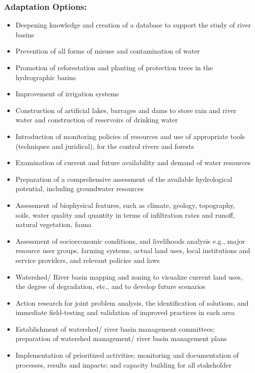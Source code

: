 \documentclass[
]{book}
\providecommand{\tightlist}{%
  \setlength{\itemsep}{0pt}\setlength{\parskip}{0pt}}
\begin{document}
\hypertarget{adaptation-options-3}{%
\subsubsection{Adaptation Options:}\label{adaptation-options-3}}

\begin{itemize}
\tightlist
\item
  Deepening knowledge and creation of a database to support the study of river basins
\item
  Prevention of all forms of misuse and contamination of water
\item
  Promotion of reforestation and planting of protection trees in the hydrographic basins
\item
  Improvement of irrigation systems
\item
  Construction of artificial lakes, barrages and dams to store rain and river water and construction of reservoirs of drinking water
\item
  Introduction of monitoring policies of resources and use of appropriate tools (techniques and juridical), for the control rivers and forests
\item
  Examination of current and future availability and demand of water resources
\item
  Preparation of a comprehensive assessment of the available hydrological potential, including groundwater resources
\item
  Assessment of biophysical features, such as climate, geology, topography, soils, water quality and quantity in terms of infiltration rates and runoff, natural vegetation, fauna
\item
  Assessment of socioeconomic conditions, and livelihoods analysis e.g., major resource user groups, farming systems, actual land uses, local institutions and service providers, and relevant policies and laws
\item
  Watershed/ River basin mapping and zoning to visualize current land uses, the degree of degradation, etc., and to develop future scenarios
\item
  Action research for joint problem analysis, the identification of solutions, and immediate field-testing and validation of improved practices in each area
\item
  Establishment of watershed/ river basin management committees; preparation of watershed management/ river basin management plans
\item
  Implementation of prioritized activities; monitoring and documentation of processes, results and impacts; and capacity building for all stakeholder
\end{itemize}
\end{document}
